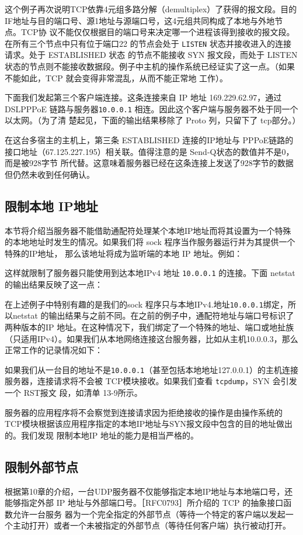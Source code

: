 这个例子再次说明TCP依靠4元组多路分解（demultiplex）了获得的报文段。目的IF地址与目的端口号、源1地址与源端口号，这4元组共同构成了本地与外地节点。TCP协
议不能仅仅根据目的端口号来决定哪一个进程该得到接收的报文段。在所有三个节点中只有位于端口22 的节点会处于 \verb|LISTEN| 状态并接收进入的连接请求。处于 ESTABLISHED 状态
的节点不能接收 SYN 报文段，而处于 LISTEN 状态的节点则不能接收数据段。例子中主机的操作系统已经证实了这一点。（如果不能如此，TCP 就会变得非常混乱，从而不能正常地
工作）。

下面我们发起第三个客户端连接。这条连接来自 IP 地址 169.229.62.97，通过DSLPPPoE 链路与服务器\verb|10.0.0.1| 相连。因此这个客户端与服务器不处于同一个以太网。（为了清
楚起见，下面的输出结果移除了 Proto 列，只留下了 tcp部分。）

在这台多宿主的主机上，第三条 ESTABLISHED 连接的IP地址与 PPPoE链路的接口地址（67.125.227.195）相关联。值得注意的是 Send-Q状态的数值并不是0，而是被928字节
所代替。这意味着服务器已经在这条连接上发送了928字节的数据但仍然未收到任何确认。
\subsection{限制本地 IP地址}
本节将介绍当服务器不能借助通配符处理某个本地IP地址而将其设置为一个特殊的本地地址时发生的情况。如果我们将 sock 程序当作服务器运行并为其提供一个特殊的IP地址，
那么该地址将成为监听端的本地 IP 地址。例如：

这样就限制了服务器只能使用到达本地IPv4 地址 \verb|10.0.0.1| 的连接。下面 netstat 的输出结果反映了这一点：

在上述例子中特别有趣的是我们的sock 程序只与本地IPv4.地址\verb|10.0.0.1|绑定，所以netstat 的输出结果与之前不同。在之前的例子中，通配符地址与端口号标识了两种版本的IP
地址。在这种情况下，我们绑定了一个特殊的地址、端口或地扯族（只适用IPv4）。如果我们从本地网络连接这台服务器，比如从主机10.0.0.3，那么正常工作的记录情况如下：

如果我们从一台目的地址不是\verb|10.0.0.1|（甚至包括本地地址127.0.0.1）的主机连接服务器，连接请求将不会被 TCP模块接收。如果我们查看 \verb|tcpdump|，SYN 会引发一个 RST报文
段，如清单 13-9所示。

服务器的应用程序将不会察觉到连接请求\textemdash 因为拒绝接收的操作是由操作系统的TCP模块根据该应用程序指定的本地IP地址与SYN报文段中包含的目的地址做出的。我们发现
限制本地IP 地址的能力是相当严格的。
\subsection{限制外部节点}
根据第10章的介绍，一台UDP服务器不仅能够指定本地IP地址与本地端口号，还能够指定外部 IP 地址与外部端口号。［RFC0793］所介绍的 TCP 的抽象接口函数允许一台服务
器为一个完全指定的外部节点（等待一个特定的客户端以发起一个主动打开）或者一个未被指定的外部节点（等待任何客户端）执行被动打开。

